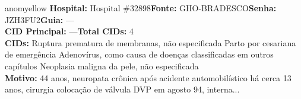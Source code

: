 \documentclass[a4paper,10pt]{article}
\begin{document}
\begin{anomalycard}[Interna\c{c}\~{a}o \#118777 | Pac. \#98528 | MODERADO (z=2.11) | LOS: 17d | 21/02/2026\,$\to$\,10/03/2026]{anomyellow}
\textbf{Hospital:} Hospital \#32898\quad \textbf{Fonte:} GHO-BRADESCO\quad \textbf{Senha:} JZH3FU2\quad \textbf{Guia:} ---\\

\textbf{CID Principal:} {\small ---}\quad\textbf{Total CIDs:} 4\\

\textbf{CIDs:} {\scriptsize Ruptura prematura de membranas, não especificada \textbar{} Parto por cesariana de emergência \textbar{} Adenovírus, como causa de doenças classificadas em outros capítulos \textbar{} Neoplasia maligna da pele, não especificada}\\

\textbf{Motivo:} {\scriptsize 44 anos, neuropata crônica após acidente automobilístico há cerca 13 anos, cirurgia colocação de válvula DVP em agosto 94, interna...}\\




\end{anomalycard}
\end{document}
